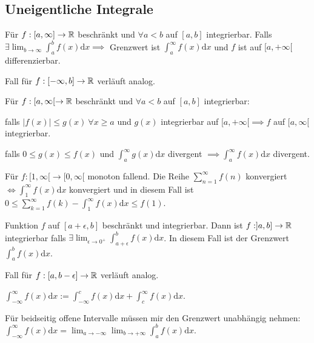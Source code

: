 \subsection{Uneigentliche Integrale}
\begin{compactitem}
    \item Für $f: [a, \infty] \to \mathbb{R}$ beschränkt und $\forall a < b$ auf $[a,b]$ integrierbar. Falls $\exists \lim_{b \to \infty} \int_{a}^{b} f(x) \mathrm{d}x \implies$ Grenzwert ist $\int_{a}^{\infty} f(x) \mathrm{d}x$ und $f$ ist auf $[a, +\infty[$ differenzierbar.
    \begin{compactitem}
        \item Fall für $f:[-\infty, b] \to \mathbb{R}$ verläuft analog.
    \end{compactitem}
    \item Für $f:[a, \infty[ \to \mathbb{R}$ beschränkt und $\forall a < b$ auf $[a,b]$ integrierbar:
        \begin{compactitem}
            \item falls $|f(x)| \le g(x) \ \forall x \ge a$ und $g(x)$ integrierbar auf $[a, +\infty[ \implies f$ auf $[a, \infty[$ integrierbar.
            \item falls $0 \le g(x) \le f(x)$ und $\int_{a}^{\infty} g(x) \mathrm{d}x$ divergent $\implies \int_{a}^{\infty} f(x) \mathrm{d}x$ divergent.
        \end{compactitem}
    \item Für $f: [1, \infty[ \to [0, \infty[$ monoton fallend. Die Reihe $\sum_{n=1}^{\infty} f(n)$ konvergiert $\iff \int_{1}^{\infty} f(x) \mathrm{d}x$ konvergiert und in diesem Fall ist $0 \le \sum_{k=1}^{\infty} f(k) - \int_{1}^{\infty} f(x) \mathrm{d}x \le f(1)$.
    \item Funktion $f$ auf $[a + \epsilon, b]$ beschränkt und integrierbar. Dann ist $f:]a,b] \to \mathbb{R}$ integrierbar falls $\exists \lim_{\epsilon \to 0^+} \int_{a + \epsilon}^{b} f(x) \mathrm{d}x$. In diesem Fall ist der Grenzwert $\int_{a}^{b} f(x) \mathrm{d}x$.
    \begin{compactitem}
        \item Fall für $f:[a, b - \epsilon] \to \mathbb{R}$ verläuft analog.
    \end{compactitem}
    \item $\int_{-\infty}^{\infty} f(x) \mathrm{d}x := \int_{-\infty}^{c} f(x) \mathrm{d}x + \int_{c}^{\infty} f(x) \mathrm{d}x$.
    \item Für beidseitig offene Intervalle müssen mir den Grenzwert unabhängig nehmen: $\int_{-\infty}^{\infty} f(x) \mathrm{d}x = \lim_{a \to -\infty} \lim_{b \to +\infty} \int_{a}^{b} f(x) \mathrm{d}x$.
\end{compactitem}

